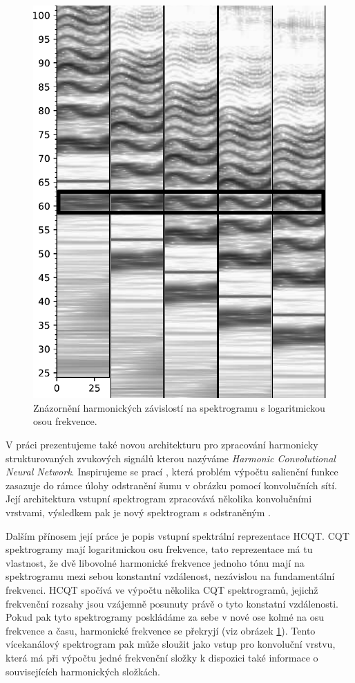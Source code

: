 \begin{figure}[h]\centering
    \includegraphics[scale=0.5]{../img/spectrograms_grey}
\caption{Znázornění harmonických závislostí na spektrogramu s logaritmickou osou frekvence.}\label{obr:hcqt}
\end{figure}

V práci prezentujeme také novou architekturu pro zpracování harmonicky strukturovaných zvukových signálů kterou nazýváme \emph{Harmonic Convolutional Neural Network}. Inspirujeme se prací \cite{Bittner2017}, která problém výpočtu salienční funkce zasazuje do rámce úlohy odstranění šumu v obrázku pomocí konvolučních sítí. Její architektura vstupní spektrogram zpracovává několika konvolučními vrstvami, výsledkem pak je nový spektrogram s odstraněným . 

Dalším přínosem její práce je popis vstupní spektrální reprezentace HCQT. CQT spektrogramy mají logaritmickou osu frekvence, tato reprezentace má tu vlastnost, že dvě libovolné harmonické frekvence jednoho tónu mají na spektrogramu mezi sebou konstantní vzdálenost, nezávislou na fundamentální frekvenci. HCQT spočívá ve výpočtu několika CQT spektrogramů, jejichž frekvenční rozsahy jsou vzájemně posunuty právě o tyto konstatní vzdálenosti. Pokud pak tyto spektrogramy poskládáme za sebe v nové ose kolmé na osu frekvence a času, harmonické frekvence se překryjí (viz obrázek \ref{obr:hcqt}). Tento vícekanálový spektrogram pak může sloužit jako vstup pro konvoluční vrstvu, která má při výpočtu jedné frekvenční složky k dispozici také informace o souvisejících harmonických složkách.

